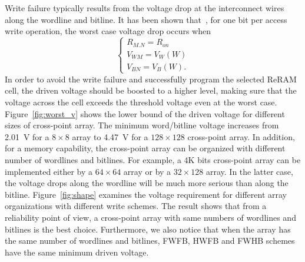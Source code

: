 
Write failure typically results from the voltage drop at the interconnect wires along the wordline and bitline. It has been shown that~\cite{crossbar_TED_2010}, for one bit per access write operation, the worst case voltage drop occurs when
\begin{equation}
\left\{
\begin{array}{l}
R_{M.N}=R_{on}\\
V_{WM}=V_W(W)\\
V_{BN}=V_B(W).
\end{array} \right.
\end{equation}
In order to avoid the write failure and successfully program the
selected ReRAM cell, the driven voltage should be boosted to a higher
level, making sure that the voltage across the cell exceeds the threshold
voltage even at the worst case. Figure~\ref{fig:worst_v} shows the lower bound of the driven voltage for different sizes of cross-point array. The minimum word/bitline voltage increases from 2.01~V for a $8 \times 8$ array to 4.47~V for a $128 \times 128$ cross-point array. In addition, for a  memory capability, the cross-point array can be organized with different number of wordlines and bitlines. For example, a 4K bits cross-point array can be implemented either by a $64 \times 64$ array or by a $32 \times 128$ array. In the latter case, the voltage drops along the wordline will be much more serious than along the bitline. Figure~\ref{fig:shape}
examines the voltage requirement for different array organizations with different write schemes. The result shows that from a reliability point of view, a cross-point array with same numbers of wordlines and bitlines is the best choice. Furthermore, we also notice that when the array has the same number of wordlines and bitlines, FWFB, HWFB and FWHB schemes have the same minimum driven voltage.


